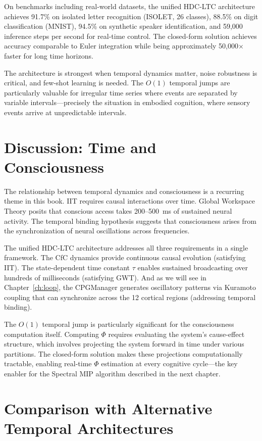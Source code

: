 \documentclass[12pt]{book}
\begin{document}
On benchmarks including real-world datasets, the unified HDC-LTC architecture achieves 91.7\% on isolated letter recognition (ISOLET, 26 classes), 88.5\% on digit classification (MNIST), 94.5\% on synthetic speaker identification, and 59,000 inference steps per second for real-time control. The closed-form solution achieves accuracy comparable to Euler integration while being approximately 50,000$\times$ faster for long time horizons.

The architecture is strongest when temporal dynamics matter, noise robustness is critical, and few-shot learning is needed. The $O(1)$ temporal jumps are particularly valuable for irregular time series where events are separated by variable intervals---precisely the situation in embodied cognition, where sensory events arrive at unpredictable intervals.

\section{Discussion: Time and Consciousness}

The relationship between temporal dynamics and consciousness is a recurring theme in this book. IIT requires causal interactions over time. Global Workspace Theory posits that conscious access takes 200--500~ms of sustained neural activity. The temporal binding hypothesis suggests that consciousness arises from the synchronization of neural oscillations across frequencies.

The unified HDC-LTC architecture addresses all three requirements in a single framework. The CfC dynamics provide continuous causal evolution (satisfying IIT). The state-dependent time constant $\tau$ enables sustained broadcasting over hundreds of milliseconds (satisfying GWT). And as we will see in Chapter~\ref{ch:loop}, the CPGManager generates oscillatory patterns via Kuramoto coupling that can synchronize across the 12 cortical regions (addressing temporal binding).

The $O(1)$ temporal jump is particularly significant for the consciousness computation itself. Computing $\Phi$ requires evaluating the system's cause-effect structure, which involves projecting the system forward in time under various partitions. The closed-form solution makes these projections computationally tractable, enabling real-time $\Phi$ estimation at every cognitive cycle---the key enabler for the Spectral MIP algorithm described in the next chapter.

\section{Comparison with Alternative Temporal Architectures}
\end{document}
